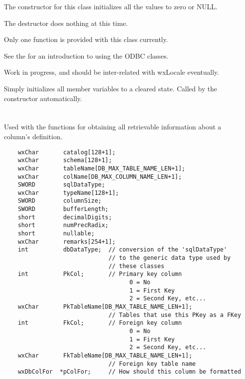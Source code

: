 The constructor for this class initializes all the values to zero or NULL.

The destructor does nothing at this time.

Only one function is provided with this class currently.

See the  for
an introduction to using the ODBC classes.

\label{wxdbcolforformat}

\label{wxdbcolforformat}

Work in progress, and should be inter-related with wxLocale eventually.

\label{wxdbcolforinitialize}

Simply initializes all member variables to a cleared state.  Called by
the constructor automatically.

\section{}\label{wxdbcolinf}

Used with the  functions for obtaining all retrievable information about a column's definition.

\begin{verbatim}
    wxChar       catalog[128+1];
    wxChar       schema[128+1];
    wxChar       tableName[DB_MAX_TABLE_NAME_LEN+1];
    wxChar       colName[DB_MAX_COLUMN_NAME_LEN+1];
    SWORD        sqlDataType;
    wxChar       typeName[128+1];
    SWORD        columnSize;
    SWORD        bufferLength;
    short        decimalDigits;
    short        numPrecRadix;
    short        nullable;
    wxChar       remarks[254+1];
    int          dbDataType;  // conversion of the 'sqlDataType'
                              // to the generic data type used by
                              // these classes
    int          PkCol;       // Primary key column
                                    0 = No
                                    1 = First Key
                                    2 = Second Key, etc...
    wxChar       PkTableName[DB_MAX_TABLE_NAME_LEN+1];
                              // Tables that use this PKey as a FKey
    int          FkCol;       // Foreign key column
                                    0 = No
                                    1 = First Key
                                    2 = Second Key, etc...
    wxChar       FkTableName[DB_MAX_TABLE_NAME_LEN+1];
                              // Foreign key table name
    wxDbColFor  *pColFor;     // How should this column be formatted
\end{verbatim}

